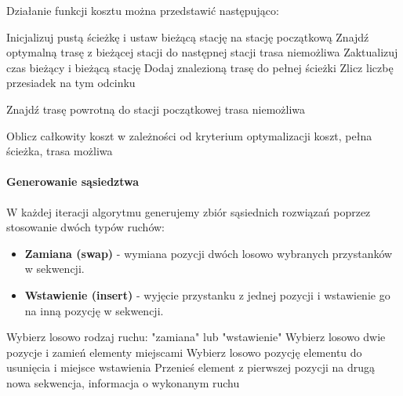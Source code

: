 \documentclass[12pt,a4paper]{article}
\begin{document}
Działanie funkcji kosztu można przedstawić następująco:

\begin{algorithmic}[1]
    \State Inicjalizuj pustą ścieżkę i ustaw bieżącą stację na stację początkową
        \State Znajdź optymalną trasę z bieżącej stacji do następnej stacji
            \Return trasa niemożliwa
        \EndIf
        \State Zaktualizuj czas bieżący i bieżącą stację
        \State Dodaj znalezioną trasę do pełnej ścieżki
            \State Zlicz liczbę przesiadek na tym odcinku
        \EndIf
    \EndFor
    
    \State Znajdź trasę powrotną do stacji początkowej
        \Return trasa niemożliwa
    \EndIf
    
    \State Oblicz całkowity koszt w zależności od kryterium optymalizacji
    \Return koszt, pełna ścieżka, trasa możliwa
\EndProcedure
\end{algorithmic}

\paragraph{Generowanie sąsiedztwa}
W każdej iteracji algorytmu generujemy zbiór sąsiednich rozwiązań poprzez stosowanie dwóch typów ruchów:
\begin{itemize}
    \item \textbf{Zamiana (swap)} - wymiana pozycji dwóch losowo wybranych przystanków w sekwencji.
    \item \textbf{Wstawienie (insert)} - wyjęcie przystanku z jednej pozycji i wstawienie go na inną pozycję w sekwencji.
\end{itemize}

\begin{algorithmic}[1]
    \State Wybierz losowo rodzaj ruchu: "zamiana" lub "wstawienie"
        \State Wybierz losowo dwie pozycje i zamień elementy miejscami
    \Else
        \State Wybierz losowo pozycję elementu do usunięcia i miejsce wstawienia
        \State Przenieś element z pierwszej pozycji na drugą
    \EndIf
    \State \Return nowa sekwencja, informacja o wykonanym ruchu
\EndProcedure
\end{algorithmic}
\end{document}
